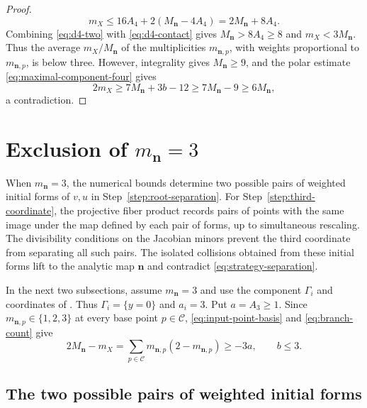 \documentclass[11pt,letterpaper]{article}
\numberwithin{equation}{section}
\theoremstyle{remark}
\theoremstyle{plain}
\begin{document}
\begin{proof}
\begin{equation}
 m_X\leq16A_4+2(M_{\boldsymbol n}-4A_4)
      =2M_{\boldsymbol n}+8A_4.                    \label{eq:d4-two}
\end{equation}
Combining \eqref{eq:d4-two} with \eqref{eq:d4-contact} gives
$M_{\boldsymbol n}>8A_4\geq8$ and $m_X<3M_{\boldsymbol n}$.
Thus the average $m_X/M_{\boldsymbol n}$ of the multiplicities $m_{\boldsymbol n,p}$,
with weights proportional to $m_{\boldsymbol n,p}$, is below three.
However, integrality gives $M_{\boldsymbol n}\geq9$, and the polar
estimate \eqref{eq:maximal-component-four} gives
\[
 2m_X\geq7M_{\boldsymbol n}+3b-12
 \geq7M_{\boldsymbol n}-9\geq6M_{\boldsymbol n},
\]
a contradiction.
\end{proof}

\section{Exclusion of
\texorpdfstring{$m_{\boldsymbol{n}}=3$}{m(n)=3}}
\label{sec:dthree}

When $m_{\boldsymbol n}=3$, the numerical bounds determine two possible
pairs of weighted initial forms of $v,u$ in Step~\ref{step:root-separation}.
For Step~\ref{step:third-coordinate}, the projective fiber product
records pairs of points with the same image under the map defined by
each pair of forms, up to simultaneous rescaling.
The divisibility conditions on the Jacobian minors prevent the third
coordinate from separating all such pairs.  The isolated collisions
obtained from these initial forms lift to the analytic map $\boldsymbol n$
and contradict
\eqref{eq:strategy-separation}.

In the next two subsections, assume $m_{\boldsymbol n}=3$ and use
the component $\Gamma_i$ and coordinates of .
Thus $\Gamma_i=\{y=0\}$ and $a_i=3$.  Put $a=A_3\geq1$.
Since $m_{\boldsymbol n,p}\in\{1,2,3\}$ at every base point $p\in\mathcal C$,
\eqref{eq:input-point-basis} and \eqref{eq:branch-count} give
\begin{equation}
 2M_{\boldsymbol n}-m_X
 =\sum_{p\in\mathcal C}m_{\boldsymbol n,p}(2-m_{\boldsymbol n,p})
 \geq-3a,\qquad b\leq3.
 \label{eq:d3-point-bounds}
\end{equation}
\subsection{The two possible pairs of weighted initial forms}
\end{document}
